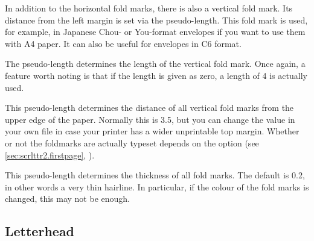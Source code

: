 \begin{Declaration}
\end{Declaration}
In addition to the horizontal fold marks,
there is also a vertical fold mark. Its distance from the left margin is set
via the  pseudo-length. This fold mark is used, for
example, in Japanese Chou- or You-format envelopes if you want to use them
with A4 paper. It can also be useful for envelopes in C6 format.%
\EndIndexGroup


\begin{Declaration}
\end{Declaration}
The 
pseudo-length determines the length of the vertical fold mark. Once again, a
feature worth noting is that if the length is given as zero, a length of
4 is actually used.%
\EndIndexGroup


\begin{Declaration}
\end{Declaration}
This pseudo-length determines the distance of
all vertical fold marks from the upper edge of the paper. Normally this is
3.5, but you can change the value in your own
 file in case your printer has a wider unprintable
top margin. Whether or not the foldmarks are actually typeset depends on the 
%
%
 option (see
\autoref{sec:scrlttr2.firstpage}, ).
%
\EndIndexGroup


\begin{Declaration}
\end{Declaration}
This pseudo-length determines the
thickness of all fold marks. The default is 0.2, in other words a
very thin hairline. In particular, if the colour of the fold
marks is changed, this may not be enough.%
\EndIndexGroup
%
\EndIndexGroup


\subsection{Letterhead}
\BeginIndexGroup
{}%

